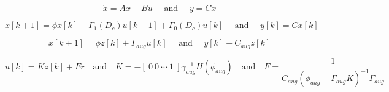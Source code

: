 \begin{equation}
\dot{x}  =  A x  +   B u  \quad{\text{   and   } }\quad  y  =  C x  
\label{eq:code1}
\end{equation}


\begin{equation}
x[k+1]= \phi x [k]+ \Gamma_1(D_c)u[k-1]+\Gamma_0(D_c)u[k] \quad \text{ and } \quad y[k] = C x[k]
\label{eq:code2}
\end{equation}


\begin{equation}
x[k+1]= \phi z [k]+ \Gamma_{aug}u[k] \quad \text{ and } \quad y[k] + C_{aug} z[k]
\label{eq:code3}
\end{equation}


\begin{equation}
u[k] = Kz[k] + Fr \quad \text{and} \quad K = -[ \ 0 \ 0 \ \cdots \ 1 \ ] \gamma_{aug}^{-1} H(\phi_{aug}) \quad \text{and} \quad F = \dfrac{1}{C_{aug} (\phi_{aug}-\Gamma_{aug}K)^{-1}\Gamma_{aug}}
\label{eq:code4}
\end{equation}